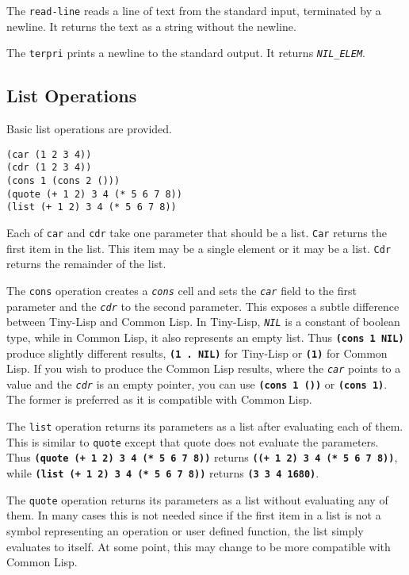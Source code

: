 \documentclass[10pt, openany]{book}
\newcommand{\operation}[1]{\textbf{\texttt{#1}}}
\newcommand{\function}[1]{\texttt{#1}}
\newcommand{\constant}[1]{\emph{\texttt{#1}}}
\newcommand{\tl}{Tiny-Lisp}
\newcommand{\cl}{Common Lisp}
\begin{document}
The \function{read-line} reads a line of text from the standard input, terminated by a newline.  It returns the text as a string without the newline.

The \function{terpri} prints a newline to the standard output.  It returns \constant{NIL\_ELEM}.

\subsection{List Operations}
Basic list operations are provided.
\begin{lstlisting}
(car (1 2 3 4))
(cdr (1 2 3 4))
(cons 1 (cons 2 ()))
(quote (+ 1 2) 3 4 (* 5 6 7 8))
(list (+ 1 2) 3 4 (* 5 6 7 8))
\end{lstlisting}

Each of \function{car} and \function{cdr} take one parameter that should be a list.  \function{Car} returns the first item in the list.  This item may be a single element or it may be a list.  \function{Cdr} returns the remainder of the list.

The \function{cons} operation creates a \constant{cons} cell and sets the \constant{car} field to the first parameter and the \constant{cdr} to the second parameter.  This exposes a subtle difference between \tl{} and \cl.  In \tl, \constant{NIL} is a constant of boolean type, while in \cl, it also represents an empty list.  Thus \operation{(cons 1 NIL)} produce slightly different results, \operation{(1 . NIL)} for \tl{} or \operation{(1)} for \cl.  If you wish to produce the \cl{} results, where the \constant{car} points to a value and the \constant{cdr} is an empty pointer, you can use \operation{(cons 1 ())} or \operation{(cons 1)}.  The former is preferred as it is compatible with \cl.

The \function{list} operation returns its parameters as a list after evaluating each of them.  This is similar to \function{quote} except that quote does not evaluate the parameters.  Thus \operation{(quote (+ 1 2) 3 4 (* 5 6 7 8))} returns \operation{((+ 1 2) 3 4 (* 5 6 7 8))}, while \operation{(list (+ 1 2) 3 4 (* 5 6 7 8))} returns \operation{(3 3 4 1680)}.

The \function{quote} operation returns its parameters as a list without evaluating any of them.  In many cases this is not needed since if the first item in a list is not a symbol representing an operation or user defined function, the list simply evaluates to itself.  At some point, this may change to be more compatible with \cl.
\end{document}
